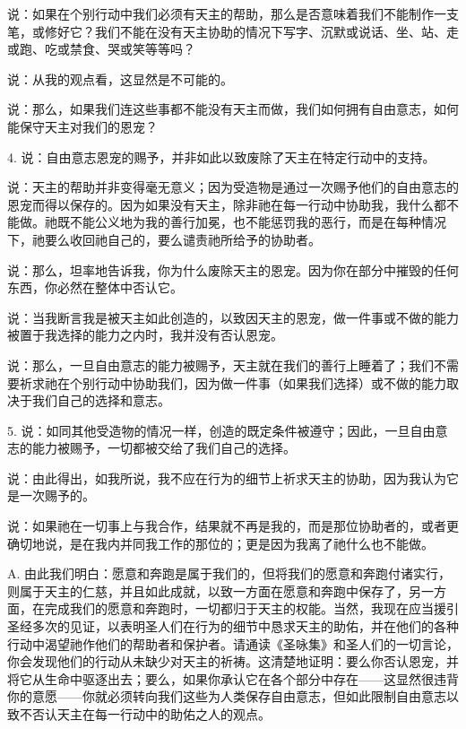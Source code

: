 说：如果在个别行动中我们必须有天主的帮助，那么是否意味着我们不能制作一支笔，或修好它？我们不能在没有天主协助的情况下写字、沉默或说话、坐、站、走或跑、吃或禁食、哭或笑等等吗？\par

说：从我的观点看，这显然是不可能的。\par

说：那么，如果我们连这些事都不能没有天主而做，我们如何拥有自由意志，如何能保守天主对我们的恩宠？\par

4. 说：自由意志恩宠的赐予，并非如此以致废除了天主在特定行动中的支持。\par

说：天主的帮助并非变得毫无意义；因为受造物是通过一次赐予他们的自由意志的恩宠而得以保存的。因为如果没有天主，除非祂在每一行动中协助我，我什么都不能做。祂既不能公义地为我的善行加冕，也不能惩罚我的恶行，而是在每种情况下，祂要么收回祂自己的，要么谴责祂所给予的协助者。\par

说：那么，坦率地告诉我，你为什么废除天主的恩宠。因为你在部分中摧毁的任何东西，你必然在整体中否认它。\par

说：当我断言我是被天主如此创造的，以致因天主的恩宠，做一件事或不做的能力被置于我选择的能力之内时，我并没有否认恩宠。\par

说：那么，一旦自由意志的能力被赐予，天主就在我们的善行上睡着了；我们不需要祈求祂在个别行动中协助我们，因为做一件事（如果我们选择）或不做的能力取决于我们自己的选择和意志。\par

5. 说：如同其他受造物的情况一样，创造的既定条件被遵守；因此，一旦自由意志的能力被赐予，一切都被交给了我们自己的选择。\par

说：由此得出，如我所说，我不应在行为的细节上祈求天主的协助，因为我认为它是一次赐予的。\par

说：如果祂在一切事上与我合作，结果就不再是我的，而是那位协助者的，或者更确切地说，是在我内并同我工作的那位的；更是因为我离了祂什么也不能做。\par

A. 由此我们明白：愿意和奔跑是属于我们的，但将我们的愿意和奔跑付诸实行，则属于天主的仁慈，并且如此成就，以致一方面在愿意和奔跑中保存了，另一方面，在完成我们的愿意和奔跑时，一切都归于天主的权能。当然，我现在应当援引圣经多次的见证，以表明圣人们在行为的细节中恳求天主的助佑，并在他们的各种行动中渴望祂作他们的帮助者和保护者。请通读《圣咏集》和圣人们的一切言论，你会发现他们的行动从未缺少对天主的祈祷。这清楚地证明：要么你否认恩宠，并将它从生命中驱逐出去；要么，如果你承认它在各个部分中存在——这显然很违背你的意愿——你就必须转向我们这些为人类保存自由意志，但如此限制自由意志以致不否认天主在每一行动中的助佑之人的观点。\par


